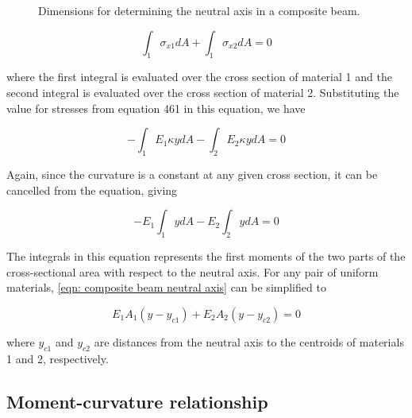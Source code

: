 \documentclass[
10pt,
a4paper,
openany,
svgnames,
]{book} %
\begin{document}
\begin{figure}[h]
  \centering
  \caption{Dimensions for determining the neutral axis in a composite beam.}
\end{figure}

\[ \int_1 \sigma_{x1}dA  + \int_1 \sigma_{x2}dA  = 0 \]

where the first integral is evaluated over the cross section of material 1 and the second integral is evaluated over the cross section of material 2. Substituting the value for stresses from equation 461 in this equation, we have

\[ - \int_1 E_1\kappa ydA  - \int_2 E_2\kappa ydA  = 0\]

Again, since the curvature is a constant at any given cross section, it can be cancelled from the equation, giving

\begin{equation} \label{eqn: composite beam neutral axis}
  -E_1\int_1 ydA  - E_2\int_2 ydA  = 0
\end{equation}

The integrals in this equation represents the first moments of the two parts of the cross-sectional area with respect to the neutral axis. For any pair of uniform materials, \cref{eqn: composite beam neutral axis} can be simplified to

\begin{equation}
  E_1A_1(y - y_{c1}) + E_2A_2(y - y_{c2}) = 0
\end{equation}

where $y_{c1}$ and $y_{c2}$ are distances from the neutral axis to the centroids of materials 1 and 2, respectively.

\subsection{Moment-curvature relationship}
\end{document}
